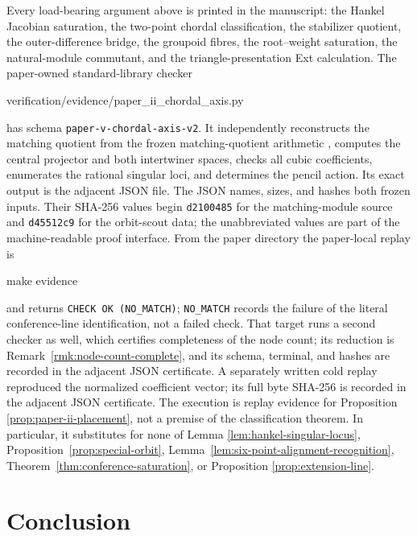 \documentclass[11pt]{article}
\theoremstyle{definition}
\theoremstyle{remark}
\begin{document}
Every load-bearing argument above is printed in the manuscript: the Hankel
Jacobian saturation, the two-point chordal classification, the stabilizer
quotient, the outer-difference bridge, the groupoid fibres, the root--weight
saturation, the natural-module commutant, and the triangle-presentation Ext
calculation.  The paper-owned standard-library checker
\begin{center}
\small\ttfamily
verification/evidence/paper\_ii\_chordal\_axis.py
\end{center}
has schema \texttt{paper-v-chordal-axis-v2}.  It independently reconstructs the matching
quotient from the frozen matching-quotient arithmetic
\cite{RuddFactorization2026}, computes the central projector
and both intertwiner spaces, checks all cubic coefficients, enumerates the
rational singular loci, and determines the pencil action.  Its exact output
is the adjacent JSON file.  The JSON names, sizes, and hashes both frozen
inputs.  Their SHA-256 values
begin \texttt{d2100485} for the matching-module source and
\texttt{d45512c9} for the orbit-scout data; the unabbreviated values are part
of the machine-readable proof interface.  From the paper directory the
paper-local replay is
\begin{center}
\small\ttfamily
make evidence
\end{center}
and returns \texttt{CHECK OK (NO\_MATCH)}; \texttt{NO\_MATCH} records the
failure of the literal conference-line identification, not a failed check.
That target runs a second checker as well, which certifies completeness of the
node count; its reduction is Remark~\ref{rmk:node-count-complete}, and its
schema, terminal, and hashes are recorded in the adjacent JSON certificate.
A separately written cold replay reproduced the normalized coefficient
vector; its full byte SHA-256 is recorded in the adjacent JSON certificate.
The execution is replay evidence for Proposition
\ref{prop:paper-ii-placement}, not a premise of the classification theorem.
In particular, it substitutes for none of Lemma
\ref{lem:hankel-singular-locus}, Proposition~\ref{prop:special-orbit},
Lemma~\ref{lem:six-point-alignment-recognition},
Theorem~\ref{thm:conference-saturation}, or Proposition
\ref{prop:extension-line}.

\section{Conclusion}
\label{sec:conclusion}
\end{document}
